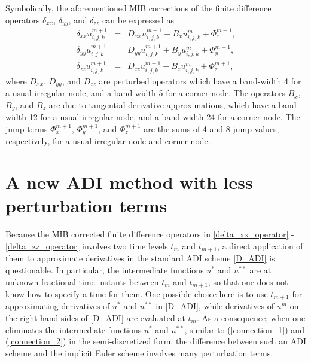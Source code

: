 \documentclass[dissertation]{uathesis}
\begin{document}
\begin{body}
Symbolically, the aforementioned MIB corrections of the finite difference operators $\delta_{xx}$, $\delta_{yy}$, and $\delta_{zz}$ can be expressed as \cite{zhao2015matched,li2017matched}
%
\begin{eqnarray} 
\delta_{xx} u^{m+1}_{i,j,k} &=& D_{xx} u^{m+1}_{i,j,k} + B_{x} u^{m}_{i,j,k} + \Phi_{x}^{m+1}, \label{delta_xx_operator} \\ 
\delta_{yy} u^{m+1}_{i,j,k} &=& D_{yy} u^{m+1}_{i,j,k} + B_{y} u^{m}_{i,j,k} + \Phi_{y}^{m+1}, \label{delta_yy_operator} \\
\delta_{zz} u^{m+1}_{i,j,k} &=& D_{zz} u^{m+1}_{i,j,k} + B_{z} u^{m}_{i,j,k} + \Phi_{z}^{m+1}, \label{delta_zz_operator}
\end{eqnarray}
%
where $D_{xx}$, $D_{yy}$, and $D_{zz}$ are perturbed operators which have a band-width 4 for a usual irregular node, and a band-width 5 for a corner node. The operators $B_{x}$, $B_{y}$, and $B_{z}$ are due to tangential derivative approximations, which have a band-width 12 for a usual irregular node, and a band-width 24 for a corner node. The jump terms $\Phi^{m+1}_{x}$, $\Phi^{m+1}_{y}$, and $\Phi^{m+1}_{z}$ are the sums of 4 and 8 jump values, respectively, for a usual irregular node and corner node.

\section{A new ADI method with less perturbation terms}
Because the MIB corrected finite difference operators in \eqref{delta_xx_operator}  - 
\eqref{delta_zz_operator} involves two time levels $t_m$ and $t_{m+1}$, a direct application of them to approximate derivatives in the standard ADI scheme \eqref{D_ADI} is questionable. In particular, the intermediate functions $u^*$ and $u^{**}$ are at unknown fractional time instants between  $t_m$ and $t_{m+1}$, so that one does not know how to specify a time for them. One possible choice here is to use $t_{m+1}$ for approximating derivatives of $u^*$ and $u^{**}$ in \eqref{D_ADI}, while derivatives of $u^m$ on the right hand sides of \eqref{D_ADI} are evaluated at $t_m$. As a consequence, when one eliminates the intermediate functions $u^*$ and $u^{**}$, similar to (\ref{connection_1}) and (\ref{connection_2}) in the semi-discretized form, the difference between such an ADI scheme and the implicit Euler scheme involves many perturbation terms. 


\end{body}
\end{document}
